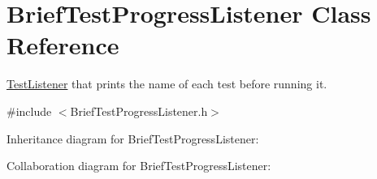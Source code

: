 \hypertarget{class_brief_test_progress_listener}{\section{Brief\+Test\+Progress\+Listener Class Reference}
\label{class_brief_test_progress_listener}
}


\hyperlink{class_test_listener}{Test\+Listener} that prints the name of each test before running it.  




{\ttfamily \#include $<$Brief\+Test\+Progress\+Listener.\+h$>$}



Inheritance diagram for Brief\+Test\+Progress\+Listener\+:


Collaboration diagram for Brief\+Test\+Progress\+Listener\+:
